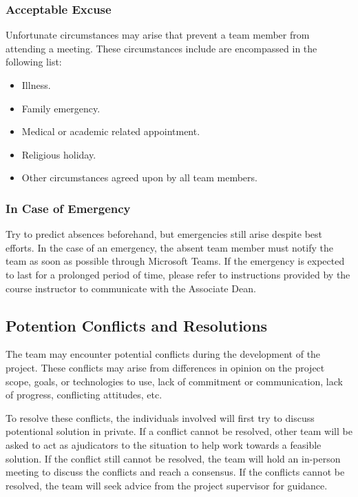 \documentclass{article}
\begin{document}
\subsubsection*{Acceptable Excuse}

Unfortunate circumstances may arise that prevent a team member from attending a
meeting. These circumstances include are encompassed in the following list:
\begin{itemize}
  \item Illness.
  \item Family emergency.
  \item Medical or academic related appointment.
  \item Religious holiday.
  \item Other circumstances agreed upon by all team members.
\end{itemize}

\subsubsection*{In Case of Emergency}

Try to predict absences beforehand, but emergencies still arise despite best
efforts. In the case of an emergency, the absent team member must notify the
team as soon as possible through Microsoft Teams. If the emergency is expected
to last for a prolonged period of time, please refer to instructions provided by
the course instructor to communicate with the Associate Dean.

\subsection*{Potention Conflicts and Resolutions}

The team may encounter potential conflicts during the development of the 
project. These conflicts may arise from differences in opinion on the 
project scope, goals, or technologies to use, lack of commitment or 
communication, lack of progress, conflicting attitudes, etc. 

To resolve these conflicts, the individuals involved will first try to discuss 
potentional solution in private. If a conflict cannot be resolved, other team 
will be asked to act as ajudicators to the situation to help work towards a 
feasible solution. If the conflict still cannot be resolved, the team will hold 
an in-person meeting to discuss the conflicts and reach a consensus. 
If the conflicts cannot be resolved, the team will seek advice from the 
project supervisor for guidance. 
\end{document}
